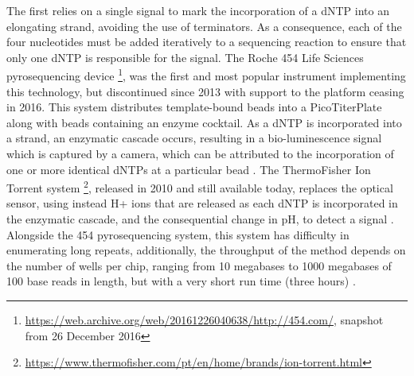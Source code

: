 The first relies on a single signal to mark the incorporation of a \ac{dNTP} into an elongating strand, avoiding the use of terminators. 
As a consequence, each of the four nucleotides must be added iteratively to a sequencing reaction to ensure that only one \ac{dNTP} is responsible for the signal. 
The Roche 454 Life Sciences pyrosequencing device \footnote{\url{https://web.archive.org/web/20161226040638/http://454.com/}, snapshot from 26 December 2016}, was the first and most popular instrument implementing this technology, but discontinued since 2013 with support to the platform ceasing in 2016. 
This system distributes template-bound beads into a PicoTiterPlate along with beads containing an enzyme cocktail. 
As a \ac{dNTP} is incorporated into a strand, an enzymatic cascade occurs, resulting in a bio-luminescence signal which is captured by a camera, which can be attributed to the incorporation of one or more identical \ac{dNTP}s at a particular bead \citep{goodwin_coming_2016}. 
The ThermoFisher Ion Torrent system \footnote{\url{https://www.thermofisher.com/pt/en/home/brands/ion-torrent.html}}, released in 2010 and still available today, replaces the optical sensor, using instead  H+ ions that are released as each \ac{dNTP} is incorporated in the enzymatic cascade, and the consequential change in pH, to detect a signal \citep{goodwin_coming_2016}. 
Alongside the 454 pyrosequencing system, this system has difficulty in enumerating long repeats, additionally, the throughput of the method depends on the number of wells per chip, ranging from 10 megabases to 1000 megabases of 100 base reads in length, but with a very short run time (three hours) \citep{hagemann_overview_2015, loman_performance_2012}.

